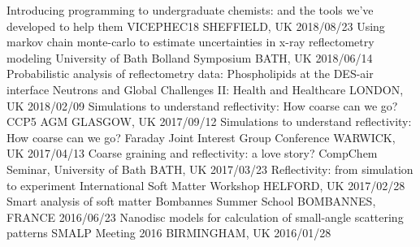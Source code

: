 \begin{cvhonors}
  \cvhonor
    {Introducing programming to undergraduate chemists: and the tools we've developed to help them}
    {VICEPHEC18}
    {SHEFFIELD, UK}
    {2018/08/23}
  \cvhonor
    {Using markov chain monte-carlo to estimate uncertainties in x-ray reflectometry modeling}
    {University of Bath Bolland Symposium}
    {BATH, UK}
    {2018/06/14}
  \cvhonor
    {Probabilistic analysis of reflectometry data: Phospholipids at the DES-air interface}
    {Neutrons and Global Challenges II: Health and Healthcare}
    {LONDON, UK}
    {2018/02/09}
  \cvhonor
    {Simulations to understand reflectivity: How coarse can we go?}
    {CCP5 AGM}
    {GLASGOW, UK}
    {2017/09/12}
  \cvhonor
  	{Simulations to understand reflectivity: How coarse can we go?}
    {Faraday Joint Interest Group Conference}
    {WARWICK, UK}
    {2017/04/13}
  \cvhonor
  	{Coarse graining and reflectivity: a love story?}
    {CompChem Seminar, University of Bath}
    {BATH, UK}
    {2017/03/23}
  \cvhonor
  	{Reflectivity: from simulation to experiment}
    {International Soft Matter Workshop}
    {HELFORD, UK}
    {2017/02/28}
  \cvhonor
    {Smart analysis of soft matter}
    {Bombannes Summer School}
    {BOMBANNES, FRANCE}
    {2016/06/23}
  \cvhonor
    {Nanodisc models for calculation of small-angle scattering patterns}
    {SMALP Meeting 2016}
    {BIRMINGHAM, UK}
    {2016/01/28}
\end{cvhonors}
